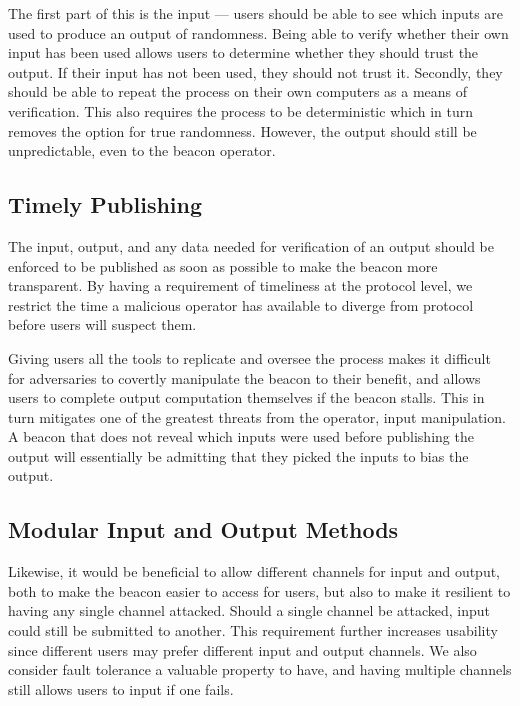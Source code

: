 The first part of this is the input --- users should be able to see which inputs are used to produce an output of randomness.
Being able to verify whether their own input has been used allows users to determine whether they should trust the output.
If their input has not been used, they should not trust it.
Secondly, they should be able to repeat the process on their own computers as a means of verification.
This also requires the process to be deterministic which in turn removes the option for true randomness.
However, the output should still be unpredictable, even to the beacon operator.

\subsection{Timely Publishing}
The input, output, and any data needed for verification of an output should be enforced to be published as soon as possible to make the beacon more transparent.
By having a requirement of timeliness at the protocol level, we restrict the time a malicious operator has available to diverge from protocol before users will suspect them.

Giving users all the tools to replicate and oversee the process makes it difficult for adversaries to covertly manipulate the beacon to their benefit, and allows users to complete output computation themselves if the beacon stalls.
This in turn mitigates one of the greatest threats from the operator, input manipulation.
A beacon that does not reveal which inputs were used before publishing the output will essentially be admitting that they picked the inputs to bias the output.

\subsection{Modular Input and Output Methods}
Likewise, it would be beneficial to allow different channels for input and output, both to make the beacon easier to access for users, but also to make it resilient to having any single channel attacked.
Should a single channel be attacked, input could still be submitted to another.
This requirement further increases usability since different users may prefer different input and output channels.
We also consider fault tolerance a valuable property to have, and having multiple channels still allows users to input if one fails.

